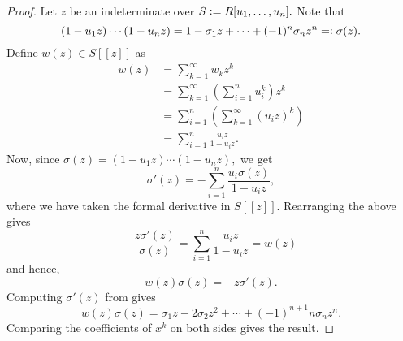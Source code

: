 \powersumformulae*\label{thm:powersumformulae2}
\begin{flushright}\hyperref[thm:powersumformulae]{\upsym}\end{flushright}
\begin{proof}
    Let $z$ be an indeterminate over $S \vcentcolon= R[u_1, \ldots, u_n].$ Note that 
    \begin{equation} \label{eq:001}
        (1 - u_1z) \cdots (1 - u_nz) = 1 - \sigma_1z + \cdots + (-1)^n \sigma_n z^n =\vcentcolon \sigma(z).
    \end{equation}
    Define $w(z) \in S[\![z]\!]$ as
    \begin{align*} 
        w(z) &= \sum_{k = 1}^{\infty} w_kz^k\\
        &= \sum_{k = 1}^{\infty}\left(\sum_{i = 1}^{n}u_i^k\right)z^k\\
        &= \sum_{i = 1}^{n} \left(\sum_{k = 1}^{\infty}(u_iz)^k\right)\\
        &= \sum_{i = 1}^{n} \frac{u_iz}{1 - u_iz}.
    \end{align*}
    Now, since $\sigma(z) = (1 - u_1z) \cdots (1 - u_nz),$ we get
    \begin{equation*} 
        \sigma'(z) = - \sum_{i = 1}^{n} \frac{u_i \sigma(z)}{1 - u_i z},
    \end{equation*}
    where we have taken the formal derivative in $S[\![z]\!].$ Rearranging the above gives
    \begin{equation*} 
        -\frac{z\sigma'(z)}{\sigma(z)} = \sum_{i = 1}^{n}\frac{u_i z}{1 - u_i z} = w(z)
    \end{equation*}
    and hence,
    \begin{equation*} 
        w(z)\sigma(z) = -z\sigma'(z).
    \end{equation*}
    Computing $\sigma'(z)$ from  gives
    \begin{equation*} 
        w(z)\sigma(z) = \sigma_1z - 2\sigma_2z^2 + \cdots + (-1)^{n + 1}n\sigma_nz^n.
    \end{equation*}
    Comparing the coefficients of $x^k$ on both sides gives the result.
\end{proof}

